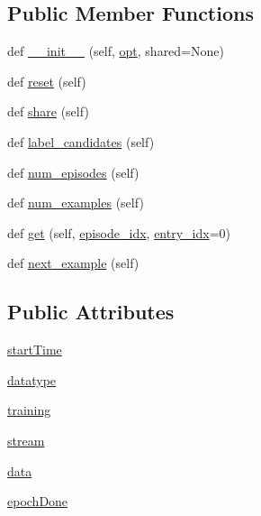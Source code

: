 \subsection*{Public Member Functions}
\begin{DoxyCompactItemize}
\item 
def \hyperlink{classparlai_1_1core_1_1teachers_1_1DialogTeacher_a9385b9ae914ef84be6b54107811b202b}{\+\_\+\+\_\+init\+\_\+\+\_\+} (self, \hyperlink{classparlai_1_1core_1_1agents_1_1Teacher_a3ce6243860ce978a897922863ed32fa4}{opt}, shared=None)
\item 
def \hyperlink{classparlai_1_1core_1_1teachers_1_1DialogTeacher_a393f94ea28e1733f575a9f36a0b43c18}{reset} (self)
\item 
def \hyperlink{classparlai_1_1core_1_1teachers_1_1DialogTeacher_a55fc9dead757489e127ec1a872849376}{share} (self)
\item 
def \hyperlink{classparlai_1_1core_1_1teachers_1_1DialogTeacher_a50649105cc9d00bcaa860290d804eac9}{label\+\_\+candidates} (self)
\item 
def \hyperlink{classparlai_1_1core_1_1teachers_1_1DialogTeacher_af1e90a07058dc489c45280f0982e21be}{num\+\_\+episodes} (self)
\item 
def \hyperlink{classparlai_1_1core_1_1teachers_1_1DialogTeacher_ad90c8cac27f2db22db77e29828b94dfe}{num\+\_\+examples} (self)
\item 
def \hyperlink{classparlai_1_1core_1_1teachers_1_1DialogTeacher_a1988d984bf87370e9a9e58c9b8ca67a8}{get} (self, \hyperlink{classparlai_1_1core_1_1teachers_1_1FixedDialogTeacher_afd4ebab8063eb42d182d30a1a41f133e}{episode\+\_\+idx}, \hyperlink{classparlai_1_1core_1_1teachers_1_1FixedDialogTeacher_ae3201b15f3c3b46a2f3511bad9b43e7d}{entry\+\_\+idx}=0)
\item 
def \hyperlink{classparlai_1_1core_1_1teachers_1_1DialogTeacher_a738c4571db2fee7ce3ab01072f10ed49}{next\+\_\+example} (self)
\end{DoxyCompactItemize}
\subsection*{Public Attributes}
\begin{DoxyCompactItemize}
\item 
\hyperlink{classparlai_1_1core_1_1teachers_1_1DialogTeacher_a8dc7153ce190442ad5d35b255389bf5a}{start\+Time}
\item 
\hyperlink{classparlai_1_1core_1_1teachers_1_1DialogTeacher_a4bd247f78e23331700e150991d0afdba}{datatype}
\item 
\hyperlink{classparlai_1_1core_1_1teachers_1_1DialogTeacher_aaca26d863c30e54b4612539843f20b49}{training}
\item 
\hyperlink{classparlai_1_1core_1_1teachers_1_1DialogTeacher_a82fa5b519a14c4301ce82f6c59c8867a}{stream}
\item 
\hyperlink{classparlai_1_1core_1_1teachers_1_1DialogTeacher_a6089018ef23e5f55862292d25628e6a5}{data}
\item 
\hyperlink{classparlai_1_1core_1_1teachers_1_1DialogTeacher_a9e2cd457217253ef6d3aa0b23418739b}{epoch\+Done}
\end{DoxyCompactItemize}
